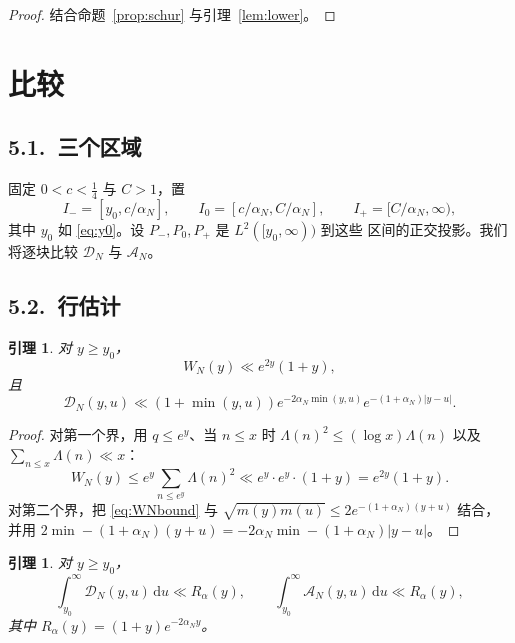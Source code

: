 \documentclass[12pt,a4paper]{amsart}
\numberwithin{equation}{section}
\theoremstyle{plain}
\newtheorem{lemma}[theorem]{引理}
\theoremstyle{definition}
\newcommand{\dd}{\,\mathrm{d}}
\begin{document}
\begin{proof}
结合命题~\ref{prop:schur} 与引理~\ref{lem:lower}。
\end{proof}

\section{比较}\label{sec:compare}

\subsection*{5.1.\ 三个区域}

固定 $0<c<\frac14$ 与 $C>1$，置
\begin{equation}\label{eq:regions}
 I_-=[y_0,c/\alpha_N],\qquad I_0=[c/\alpha_N,C/\alpha_N],\qquad
 I_+=[C/\alpha_N,\infty),
\end{equation}
其中 $y_0$ 如 \eqref{eq:y0}。设 $P_-,P_0,P_+$ 是 $L^2([y_0,\infty))$ 到这些
区间的正交投影。我们将逐块比较 $\mathcal D_N$ 与 $\mathscr A_N$。

\subsection*{5.2.\ 行估计}

\begin{lemma}\label{lem:row}
对 $y\ge y_0$，
\begin{equation}\label{eq:WNbound}
 W_N(y)\ll e^{2y}(1+y),
\end{equation}
且
\begin{equation}\label{eq:Dbound}
 \mathscr D_N(y,u)\ll(1+\min(y,u))e^{-2\alpha_N\min(y,u)}
 e^{-(1+\alpha_N)|y-u|}.
\end{equation}
\end{lemma}

\begin{proof}
对第一个界，用 $q\le e^y$、当 $n\le x$ 时 $\Lambda(n)^2\le(\log x)\Lambda(n)$
以及 $\sum_{n\le x}\Lambda(n)\ll x$：
\[
 W_N(y)\le e^y\sum_{n\le e^y}\Lambda(n)^2
 \ll e^y\cdot e^y\cdot(1+y)=e^{2y}(1+y).
\]
对第二个界，把 \eqref{eq:WNbound} 与
$\sqrt{m(y)m(u)}\le2e^{-(1+\alpha_N)(y+u)}$ 结合，并用
$2\min-(1+\alpha_N)(y+u)=-2\alpha_N\min-(1+\alpha_N)|y-u|$。
\end{proof}

\begin{lemma}\label{lem:rows}
对 $y\ge y_0$，
\begin{equation}\label{eq:rowD}
 \int_{y_0}^{\infty}\mathscr D_N(y,u)\dd u\ll R_\alpha(y),
 \qquad
 \int_{y_0}^{\infty}\mathscr A_N(y,u)\dd u\ll R_\alpha(y),
\end{equation}
其中 $R_\alpha(y)=(1+y)e^{-2\alpha_Ny}$。
\end{lemma}
\end{document}
